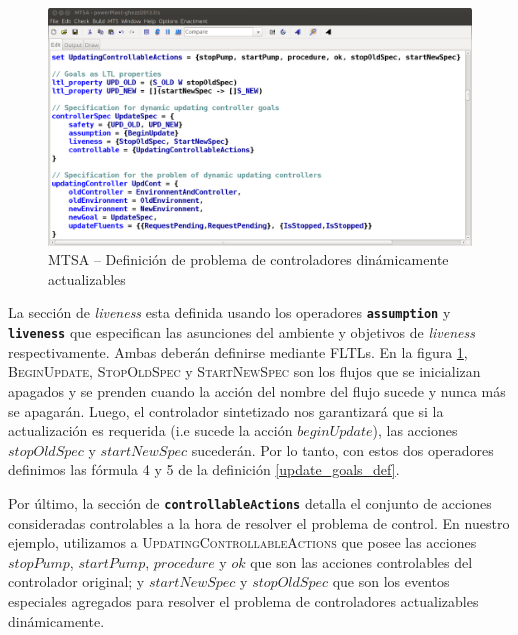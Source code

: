\begin{figure}
    \centering
    \includegraphics[scale=0.35]{img/MTSA_example.png}
    \caption{MTSA -- Definición de problema de controladores dinámicamente actualizables}
    \label{MTSA_example}
\end{figure}

La sección de \emph{liveness} esta definida usando los operadores \texttt{\textbf{assumption}} y
\texttt{\textbf{liveness}} que especifican las asunciones del ambiente y objetivos de \emph{liveness} respectivamente.
Ambas deberán definirse mediante FLTLs. En la figura \ref{MTSA_example}, \textsc{BeginUpdate}, \textsc{StopOldSpec} y
\textsc{StartNewSpec} son los flujos que se inicializan apagados y se prenden cuando la acción del nombre del flujo
sucede y nunca más se apagarán. Luego, el controlador sintetizado nos garantizará que si la actualización es requerida
(i.e sucede la acción $beginUpdate$), las acciones $stopOldSpec$ y $startNewSpec$ sucederán. Por lo tanto,
con estos dos operadores definimos las fórmula 4 y 5 de la definición \ref{update_goals_def}.

Por último, la sección de \texttt{\textbf{controllableActions}} detalla el conjunto de acciones consideradas
controlables a la hora de resolver el problema de control. En nuestro ejemplo, utilizamos a
\textsc{UpdatingControllableActions} que posee las acciones $stopPump$, $startPump$, $procedure$ y $ok$ que son las
acciones controlables del controlador original; y $startNewSpec$ y $stopOldSpec$ que son los eventos especiales
agregados para resolver el problema de controladores actualizables dinámicamente.





